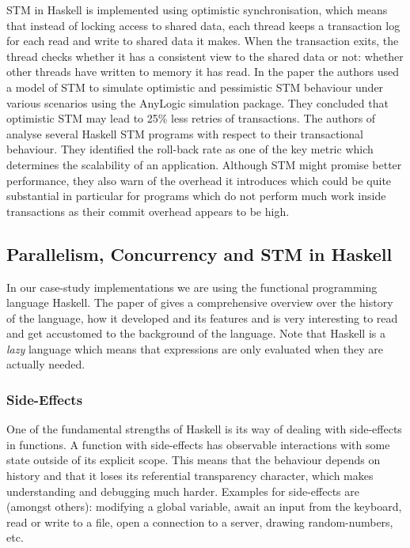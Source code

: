 STM in Haskell is implemented using optimistic synchronisation, which means that instead of locking access to shared data, each thread keeps a transaction log for each read and write to shared data it makes. When the transaction exits, the thread checks whether it has a consistent view to the shared data or not: whether other threads have written to memory it has read. %
In the paper \cite{heindl_modeling_2009} the authors used a model of STM to simulate optimistic and pessimistic STM behaviour under various scenarios using the AnyLogic simulation package. They concluded that optimistic STM may lead to 25\% less retries of transactions. The authors of \cite{perfumo_limits_2008} analyse several Haskell STM programs with respect to their transactional behaviour. They identified the roll-back rate as one of the key metric which determines the scalability of an application. Although STM might promise better performance, they also warn of the overhead it introduces which could be quite substantial in particular for programs which do not perform much work inside transactions as their commit overhead appears to be high.

\subsection{Parallelism, Concurrency and STM in Haskell}
In our case-study implementations we are using the functional programming language Haskell. The paper of \citep{hudak_history_2007} gives a comprehensive overview over the history of the language, how it developed and its features and is very interesting to read and get accustomed to the background of the language. Note that Haskell is a \textit{lazy} language which means that expressions are only evaluated when they are actually needed.

\subsubsection{Side-Effects}
One of the fundamental strengths of Haskell is its way of dealing with side-effects in functions. A function with side-effects has observable interactions with some state outside of its explicit scope. This means that the behaviour depends on history and that it loses its referential transparency character, which makes understanding and debugging much harder. Examples for side-effects are (amongst others): modifying a global variable, await an input from the keyboard, read or write to a file, open a connection to a server, drawing random-numbers, etc.

